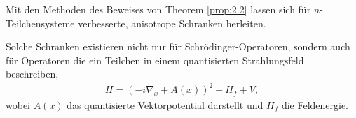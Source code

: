 \begin{bem*}
\begin{bemenum}
\item Mit den Methoden des Beweises von Theorem \ref{prop:2.2} lassen sich für
$n$-Teilchensysteme verbesserte, anisotrope Schranken herleiten.
\item Solche Schranken existieren nicht nur für Schrödinger-Operatoren, sondern
auch für Operatoren die ein Teilchen in einem quantisierten Strahlungsfeld
beschreiben,
\begin{align*}
H = (-i\nabla_x  + A(x))^2 + H_f + V,
\end{align*}
wobei $A(x)$ das quantisierte Vektorpotential darstellt und $H_f$ die
Feldenergie.\map
\end{bemenum}
\end{bem*}
% 
% 
